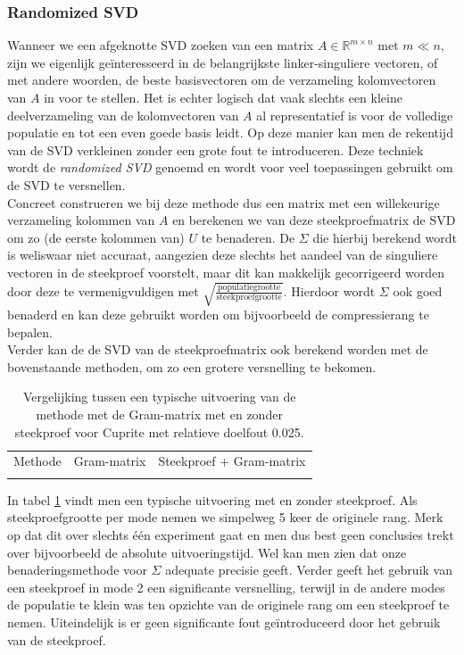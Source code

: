 \subsubsection{Randomized SVD}

Wanneer we een afgeknotte SVD zoeken van een matrix $A \in \mathbb{R}^{m \times n}$ met $m \ll n$, zijn we eigenlijk ge\"interesseerd in de belangrijkste linker-singuliere vectoren, of met andere woorden, de beste basisvectoren om de verzameling kolomvectoren van $A$ in voor te stellen. Het is echter logisch dat vaak slechts een kleine deelverzameling van de kolomvectoren van $A$ al representatief is voor de volledige populatie en tot een even goede basis leidt. Op deze manier kan men de rekentijd van de SVD verkleinen zonder een grote fout te introduceren. Deze techniek wordt de \textit{randomized SVD} \cite{ref:randomized_svd} genoemd en wordt voor veel toepassingen gebruikt om de SVD te versnellen.\\

Concreet construeren we bij deze methode dus een matrix met een willekeurige verzameling kolommen van $A$ en berekenen we van deze steekproefmatrix de SVD om zo (de eerste kolommen van) $U$ te benaderen. De $\Sigma$ die hierbij berekend wordt is weliswaar niet accuraat, aangezien deze slechts het aandeel van de singuliere vectoren in de steekproef voorstelt, maar dit kan makkelijk gecorrigeerd worden door deze te vermenigvuldigen met $\sqrt{\frac{\text{populatiegrootte}}{\text{steekproefgrootte}}}$. Hierdoor wordt $\Sigma$ ook goed benaderd en kan deze gebruikt worden om bijvoorbeeld de compressierang te bepalen.\\

Verder kan de de SVD van de steekproefmatrix ook berekend worden met de bovenstaande methoden, om zo een grotere versnelling te bekomen.\\

\begin{table}[]
\centering
\begin{tabular}{|l|l|l|}
\hline
Methode & Gram-matrix & Steekproef + Gram-matrix\\ \hhline{|=|=|=|}

\end{tabular}
\caption{Vergelijking tussen een typische uitvoering van de methode met de Gram-matrix met en zonder steekproef voor Cuprite met relatieve doelfout 0.025.}
\label{table:randomized-svd-cuprite-test}
\end{table}

In tabel \ref{table:randomized-svd-cuprite-test} vindt men een typische uitvoering met en zonder steekproef. Als steekproefgrootte per mode nemen we simpelweg 5 keer de originele rang. Merk op dat dit over slechts \'e\'en experiment gaat en men dus best geen conclusies trekt over bijvoorbeeld de absolute uitvoeringstijd. Wel kan men zien dat onze benaderingsmethode voor $\Sigma$ adequate precisie geeft. Verder geeft het gebruik van een steekproef in mode 2 een significante versnelling, terwijl in de andere modes de populatie te klein was ten opzichte van de originele rang om een steekproef te nemen. Uiteindelijk is er geen significante fout ge\"introduceerd door het gebruik van de steekproef.\\

